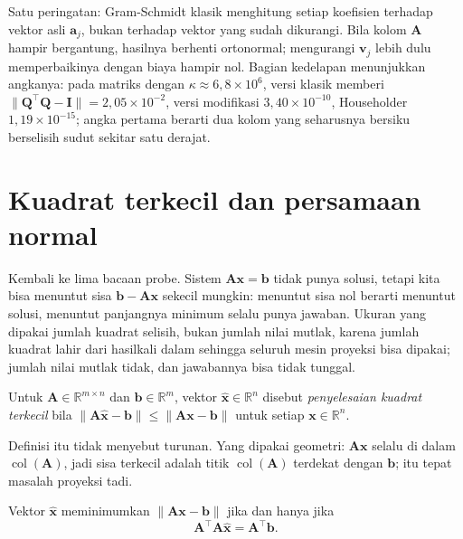 Satu peringatan: Gram-Schmidt klasik menghitung setiap koefisien terhadap vektor asli
$\mathbf{a}_{j}$, bukan terhadap vektor yang sudah dikurangi. Bila kolom $\mathbf{A}$
hampir bergantung, hasilnya berhenti ortonormal; mengurangi $\mathbf{v}_{j}$ lebih dulu
memperbaikinya dengan biaya hampir nol. Bagian kedelapan menunjukkan angkanya: pada
matriks dengan $\kappa\approx6{,}8\times10^{6}$, versi klasik memberi
$\|\mathbf{Q}^{\top}\mathbf{Q}-\mathbf{I}\|=2{,}05\times10^{-2}$, versi modifikasi
$3{,}40\times10^{-10}$, Householder $1{,}19\times10^{-15}$; angka pertama berarti dua
kolom yang seharusnya bersiku berselisih sudut sekitar satu derajat.

\section{Kuadrat terkecil dan persamaan normal}

Kembali ke lima bacaan probe. Sistem $\mathbf{A}\mathbf{x}=\mathbf{b}$ tidak punya solusi,
tetapi kita bisa menuntut sisa $\mathbf{b}-\mathbf{A}\mathbf{x}$ sekecil mungkin:
menuntut sisa nol berarti menuntut solusi, menuntut panjangnya minimum selalu punya
jawaban. Ukuran yang dipakai jumlah kuadrat selisih, bukan jumlah nilai mutlak, karena
jumlah kuadrat lahir dari hasilkali dalam sehingga seluruh mesin proyeksi bisa dipakai;
jumlah nilai mutlak tidak, dan jawabannya bisa tidak tunggal.


\begin{definisi}
Untuk $\mathbf{A}\in\mathbb{R}^{m\times n}$ dan $\mathbf{b}\in\mathbb{R}^{m}$,
vektor $\hat{\mathbf{x}}\in\mathbb{R}^{n}$ disebut \emph{penyelesaian kuadrat terkecil}
bila $\|\mathbf{A}\hat{\mathbf{x}}-\mathbf{b}\|\le\|\mathbf{A}\mathbf{x}-\mathbf{b}\|$
untuk setiap $\mathbf{x}\in\mathbb{R}^{n}$.
\end{definisi}

Definisi itu tidak menyebut turunan. Yang dipakai geometri: $\mathbf{A}\mathbf{x}$ selalu
di dalam $\operatorname{col}(\mathbf{A})$, jadi sisa terkecil adalah titik
$\operatorname{col}(\mathbf{A})$ terdekat dengan $\mathbf{b}$; itu tepat masalah proyeksi
tadi.

\begin{teorema}
Vektor $\hat{\mathbf{x}}$ meminimumkan $\|\mathbf{A}\mathbf{x}-\mathbf{b}\|$ jika dan
hanya jika
\[
  \mathbf{A}^{\top}\mathbf{A}\hat{\mathbf{x}}=\mathbf{A}^{\top}\mathbf{b}.
\]
\end{teorema}

